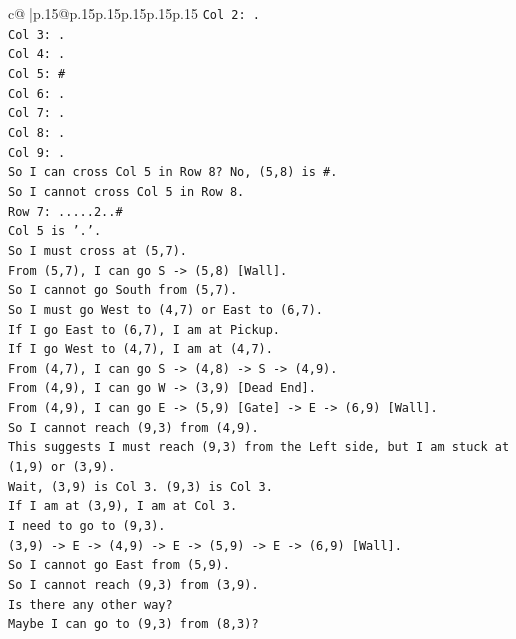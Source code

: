 \documentclass{article}
\begin{document}
{\begin{supertabular}{c@{$\;$}|p{.15\linewidth}@{}p{.15\linewidth}p{.15\linewidth}p{.15\linewidth}p{.15\linewidth}p{.15\linewidth}}
{{{\texttt{Col 2: .} \\
\texttt{Col 3: .} \\
\texttt{Col 4: .} \\
\texttt{Col 5: \#} \\
\texttt{Col 6: .} \\
\texttt{Col 7: .} \\
\texttt{Col 8: .} \\
\texttt{Col 9: .} \\
\texttt{So I can cross Col 5 in Row 8? No, (5,8) is \#.} \\
\texttt{So I cannot cross Col 5 in Row 8.} \\
\texttt{Row 7: .....2..\#} \\
\texttt{Col 5 is '.'.} \\
\texttt{So I must cross at (5,7).} \\
\texttt{From (5,7), I can go S {-}> (5,8) {[}Wall{]}.} \\
\texttt{So I cannot go South from (5,7).} \\
\texttt{So I must go West to (4,7) or East to (6,7).} \\
\texttt{If I go East to (6,7), I am at Pickup.} \\
\texttt{If I go West to (4,7), I am at (4,7).} \\
\texttt{From (4,7), I can go S {-}> (4,8) {-}> S {-}> (4,9).} \\
\texttt{From (4,9), I can go W {-}> (3,9) {[}Dead End{]}.} \\
\texttt{From (4,9), I can go E {-}> (5,9) {[}Gate{]} {-}> E {-}> (6,9) {[}Wall{]}.} \\
\texttt{So I cannot reach (9,3) from (4,9).} \\
\texttt{This suggests I must reach (9,3) from the Left side, but I am stuck at (1,9) or (3,9).} \\
\texttt{Wait, (3,9) is Col 3. (9,3) is Col 3.} \\
\texttt{If I am at (3,9), I am at Col 3.} \\
\texttt{I need to go to (9,3).} \\
\texttt{(3,9) {-}> E {-}> (4,9) {-}> E {-}> (5,9) {-}> E {-}> (6,9) {[}Wall{]}.} \\
\texttt{So I cannot go East from (5,9).} \\
\texttt{So I cannot reach (9,3) from (3,9).} \\
\texttt{Is there any other way?} \\
\texttt{Maybe I can go to (9,3) from (8,3)?} \\
}}}
\end{supertabular}}
\end{document}
